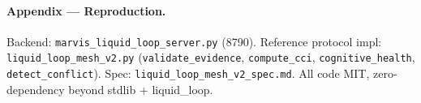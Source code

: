 \documentclass[UTF8]{ctexart}
\begin{document}
\paragraph*{Appendix --- Reproduction.}
Backend: \texttt{marvis\_liquid\_loop\_server.py} (8790).
Reference protocol impl: \texttt{liquid\_loop\_mesh\_v2.py} (\texttt{validate\_evidence},
\texttt{compute\_cci}, \texttt{cognitive\_health}, \texttt{detect\_conflict}). Spec:
\texttt{liquid\_loop\_mesh\_v2\_spec.md}. All code MIT, zero-dependency beyond stdlib +
liquid\_loop.
\end{document}
